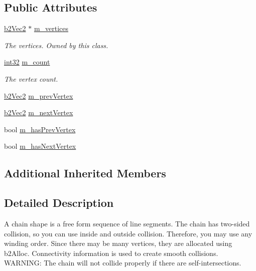 \subsection*{Public Attributes}
\begin{DoxyCompactItemize}
\item 
\mbox{\hyperlink{structb2_vec2}{b2\+Vec2}} $\ast$ \mbox{\hyperlink{classb2_chain_shape_a481116a6886fb3880b13e55c966579da}{m\+\_\+vertices}}
\begin{DoxyCompactList}\small\item\em The vertices. Owned by this class. \end{DoxyCompactList}\item 
\mbox{\hyperlink{b2_settings_8h_a43d43196463bde49cb067f5c20ab8481}{int32}} \mbox{\hyperlink{classb2_chain_shape_ab2ad711781e6ac81179074e90e0e058b}{m\+\_\+count}}
\begin{DoxyCompactList}\small\item\em The vertex count. \end{DoxyCompactList}\item 
\mbox{\hyperlink{structb2_vec2}{b2\+Vec2}} \mbox{\hyperlink{classb2_chain_shape_a3a42d4c6b2421bc5badda3b6164949cf}{m\+\_\+prev\+Vertex}}
\item 
\mbox{\hyperlink{structb2_vec2}{b2\+Vec2}} \mbox{\hyperlink{classb2_chain_shape_af3716ef780dd5bcd905e350d8854aaa2}{m\+\_\+next\+Vertex}}
\item 
bool \mbox{\hyperlink{classb2_chain_shape_a8a6ffbb9de0e2b8545c8b4fc8aa77249}{m\+\_\+has\+Prev\+Vertex}}
\item 
bool \mbox{\hyperlink{classb2_chain_shape_a333b74486566e73c3cf1f7da5e69a96e}{m\+\_\+has\+Next\+Vertex}}
\end{DoxyCompactItemize}
\subsection*{Additional Inherited Members}


\subsection{Detailed Description}
A chain shape is a free form sequence of line segments. The chain has two-\/sided collision, so you can use inside and outside collision. Therefore, you may use any winding order. Since there may be many vertices, they are allocated using b2\+Alloc. Connectivity information is used to create smooth collisions. W\+A\+R\+N\+I\+NG\+: The chain will not collide properly if there are self-\/intersections. 


